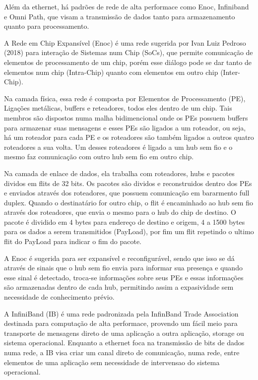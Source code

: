 \documentclass[a4paper,12pt]{article}
\begin{document}
Além da ethernet, há padrões de rede de alta performace como Enoc, Infiniband e Omni Path, que visam a transmissão de dados tanto para armazenamento quanto para processamento.

A Rede em Chip Expansível (Enoc) é uma rede sugerida por Ivan Luiz Pedroso (2018) para interação de Sistemas num Chip (SoCs), que permite comunicação de elementos de processamento de um chip, porém esse diálogo pode se dar tanto de elementos num chip (Intra-Chip) quanto com elementos em outro chip (Inter-Chip).

Na camada física, essa rede é composta por Elementos de Processamento (PE), Ligações metálicas, buffers e reteadores, todos eles dentro de um chip. Tais membros são dispostos numa malha bidimencional onde os PEs possuem buffers para armazenar suas mensagens e esses PEs são ligados a um roteador, ou seja, há um roteador para cada PE e os roteadores são também ligados a outros quatro roteadores a sua volta. Um desses roteadores é ligado a um hub sem fio e o mesmo faz comunicação com outro hub sem fio em outro chip.

Na camada de enlace de dados, ela trabalha com roteadores, hubs e pacotes dividos em flits de 32 bits. Os pacotes são dividos e reconstruidos dentro dos PEs e enviados através dos roteadores, que possuem comunicação em bararmento full duplex. Quando o destinatário for outro chip, o flit é encaminhado ao hub sem fio através dos roteadores, que envia o mesmo para o hub do chip de destino. O pacote é dividido em 4 bytes para endereço de destino e origem, 4 a 1500 bytes para os dados a serem transmitidos (PayLoad), por fim um flit repetindo o ultimo flit do PayLoad para indicar o fim do pacote.

A Enoc é sugerida para ser expansível e reconfigurável, sendo que isso se dá através de sinais que o hub sem fio envia para informar sua presença e quando esse sinal é detectado, troca-se informações sobre seus PEs e essas informações são armazenadas dentro de cada hub, permitindo assim a expasividade sem necessidade de conhecimento prévio.

A InfiniBand (IB) é uma rede padronizada pela InfinBand Trade Association destinada para computação de alta performace, provendo um fácil meio para transporte de mensagens direto de uma aplicação a outra aplicação, storage ou sistema operacional. Enquanto a ethernet foca na transmissão de bits de dados numa rede, a IB visa criar um canal direto de comunicação, numa rede, entre elementos de uma aplicação sem necessidade de intervensao do sistema operacional.
\end{document}

